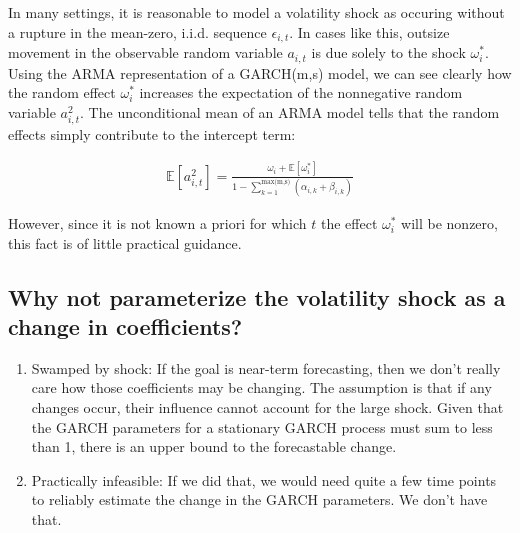 \documentclass[11pt]{article}
\theoremstyle{definition}
\begin{document}
In many settings, it is reasonable to model a volatility shock as occuring without a rupture in the mean-zero, i.i.d. sequence $\epsilon_{i,t}$.  In cases like this, outsize movement in the observable random variable $a_{i,t}$ is due solely to the shock $\omega_{i}^{*}$.  Using the ARMA representation of a GARCH(m,s) model, we can see clearly how the random effect $\omega_{i}^{*}$ increases the expectation of the nonnegative random variable $a_{i,t}^{2}$.  The unconditional mean of an ARMA model tells that the random effects simply contribute to the intercept term:

\begin{align*} 
\mathbb{E}[a^{2}_{i,t}] = \frac{\omega_{i} + \mathbb{E}[\omega_{i}^{*}] }{1 - \sum^{\text{max(m,s)}}_{k=1}(\alpha_{i,k}+\beta_{i,k})}
\end{align*} 

However, since it is not known a priori for which $t$ the effect $\omega_{i}^{*}$ will be nonzero, this fact is of little practical guidance.

\subsection{Why not parameterize the volatility shock as a change in coefficients?}
\begin{enumerate}
\item Swamped by shock: If the goal is near-term forecasting, then we don't really care how those coefficients may be changing.  The assumption is that if any changes occur, their influence cannot account for the large shock. Given that the GARCH parameters for a stationary GARCH process must sum to less than 1, there is an upper bound to the forecastable change.
\item Practically infeasible: If we did that, we would need quite a few time points to reliably estimate the change in the GARCH parameters.  We don't have that.
\end{enumerate}
\end{document}
